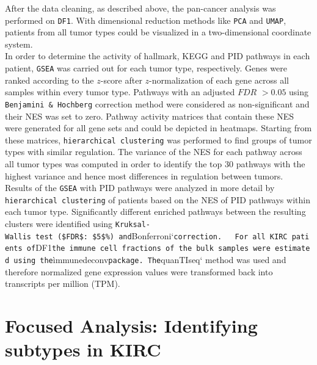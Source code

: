 \documentclass[
  parskip,
  oneside]{scrreprt}
\begin{document}
After the data cleaning, as described above, the pan-cancer analysis was
performed on \texttt{DF1}. With dimensional reduction methods like
\texttt{PCA} and \texttt{UMAP}, patients from all tumor types could be
visualized in a two-dimensional coordinate system.\\
In order to determine the activity of hallmark, KEGG and PID pathways in
each patient, \texttt{GSEA} was carried out for each tumor type,
respectively. Genes were ranked according to the \(z\)-score after
\(z\)-normalization of each gene across all samples within every tumor
type. Pathways with an adjusted \(FDR\) \(>0.05\) using
\texttt{Benjamini\ \&\ Hochberg} correction method were considered as
non-significant and their NES was set to zero. Pathway activity matrices
that contain these NES were generated for all gene sets and could be
depicted in heatmaps. Starting from these matrices,
\texttt{hierarchical\ clustering} was performed to find groups of tumor
types with similar regulation. The variance of the NES for each pathway
across all tumor types was computed in order to identify the top 30
pathways with the highest variance and hence most differences in
regulation between tumors. Results of the \texttt{GSEA} with PID
pathways were analyzed in more detail by
\texttt{hierarchical\ clustering} of patients based on the NES of PID
pathways within each tumor type. Significantly different enriched
pathways between the resulting clusters were identified using
\texttt{Kruksal-Wallis\textasciigrave{}\ test\textasciigrave{}\ (\$FDR\$:\ \$5\$\%)\ and}Bonferroni`\texttt{correction.\ \ \ For\ all\ KIRC\ patients\ of}DF1\texttt{the\ immune\ cell\ fractions\ of\ the\ bulk\ samples\ were\ estimated\ using\ the}ìmmunedeconv\texttt{package.\ The}quanTIseq`
method was used and therefore normalized gene expression values were
transformed back into transcripts per million (TPM).

\hypertarget{focused-analysis-identifying-subtypes-in-kirc}{%
\section{Focused Analysis: Identifying subtypes in
KIRC}\label{focused-analysis-identifying-subtypes-in-kirc}}
\end{document}

